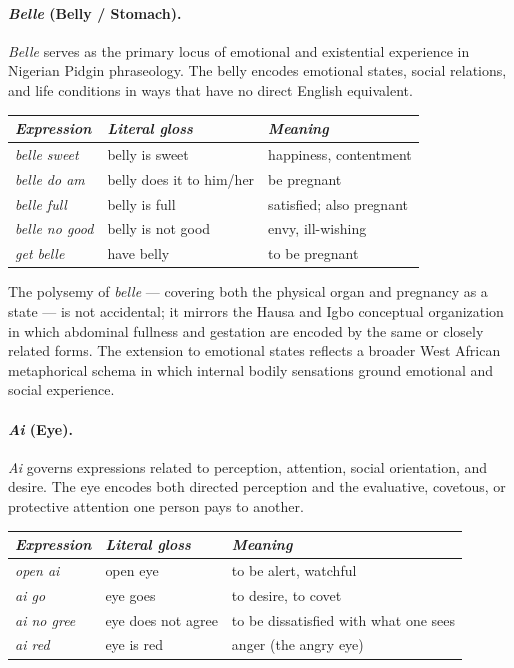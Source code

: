 \documentclass[12pt]{article}
\begin{document}
\paragraph{\textit{Belle} (Belly / Stomach).}
\textit{Belle} serves as the primary locus of emotional and existential experience in Nigerian Pidgin phraseology. The belly encodes emotional states, social relations, and life conditions in ways that have no direct English equivalent.

\begin{center}
\begin{tabular}{lll}
\textit{Expression} & \textit{Literal gloss} & \textit{Meaning} \\
\hline
\textit{belle sweet} & belly is sweet & happiness, contentment \\
\textit{belle do am} & belly does it to him/her & be pregnant \\
\textit{belle full} & belly is full & satisfied; also pregnant \\
\textit{belle no good} & belly is not good & envy, ill-wishing \\
\textit{get belle} & have belly & to be pregnant \\
\end{tabular}
\end{center}

The polysemy of \textit{belle} --- covering both the physical organ and pregnancy as a state --- is not accidental; it mirrors the Hausa and Igbo conceptual organization in which abdominal fullness and gestation are encoded by the same or closely related forms. The extension to emotional states reflects a broader West African metaphorical schema in which internal bodily sensations ground emotional and social experience.

\paragraph{\textit{Ai} (Eye).}
\textit{Ai} governs expressions related to perception, attention, social orientation, and desire. The eye encodes both directed perception and the evaluative, covetous, or protective attention one person pays to another.

\begin{center}
\begin{tabular}{lll}
\textit{Expression} & \textit{Literal gloss} & \textit{Meaning} \\
\hline
\textit{open ai} & open eye & to be alert, watchful \\
\textit{ai go} & eye goes & to desire, to covet \\
\textit{ai no gree} & eye does not agree & to be dissatisfied with what one sees \\
\textit{ai red} & eye is red & anger (the angry eye) \\
\end{tabular}
\end{center}
\end{document}
